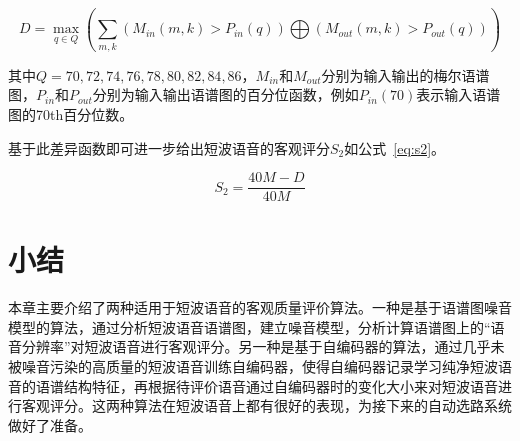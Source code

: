 \begin{equation}
D = \max\limits_{q \in Q}\left(\sum_{m, k} (M_{in}(m,k) > P_{in}(q)) \bigoplus (M_{out}(m,k) > P_{out}(q))\right)
\end{equation}

其中$Q={70,72,74,76,78,80,82,84,86}$，$M_{in}$和$M_{out}$分别为输入输出的梅尔语谱图，$P_{in}$和$P_{out}$分别为输入输出语谱图的百分位函数，例如$P_{in}(70)$表示输入语谱图的70th百分位数。

基于此差异函数即可进一步给出短波语音的客观评分$S_2$如公式~\ref{eq:s2}。

\begin{equation}\label{eq:s2}
S_2 = \frac{40M - D}{40M}
\end{equation}

\section{小结}

本章主要介绍了两种适用于短波语音的客观质量评价算法。一种是基于语谱图噪音模型的算法，通过分析短波语音语谱图，建立噪音模型，分析计算语谱图上的“语音分辨率”对短波语音进行客观评分。另一种是基于自编码器的算法，通过几乎未被噪音污染的高质量的短波语音训练自编码器，使得自编码器记录学习纯净短波语音的语谱结构特征，再根据待评价语音通过自编码器时的变化大小来对短波语音进行客观评分。这两种算法在短波语音上都有很好的表现，为接下来的自动选路系统做好了准备。